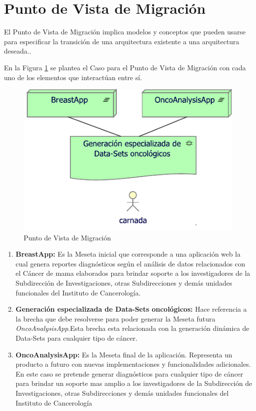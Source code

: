 \newpage
\section{Punto de Vista de Migración}
El Punto de Vista de Migración implica modelos y conceptos que pueden usarse para especificar la transición de una arquitectura existente a una arquitectura deseada.\cite{BolanosCastro2019}. 

En la Figura \ref{PvMigracion} se plantea el Caso para el Punto de Vista de Migración con cada uno de los elementos que interactúan entre sí. 

\begin{figure}[h!]
	\centering
	\includegraphics[width=0.75\linewidth]{ARQUITECTURA/imgs/CapaImplementacion/2_PvMigracion}
	\caption{Punto de Vista de Migración}
	\label{PvMigracion}
\end{figure}

\begin{enumerate}[label=\textbf{\arabic*})]
	
\item  \textbf{BreastApp:} Es la Meseta inicial que  corresponde  a una aplicación web la cual genera reportes diagnósticos según el análisis de datos relacionados con el Cáncer de mama elaborados para brindar soporte a los investigadores de la Subdirección de Investigaciones, otras Subdirecciones y demás unidades funcionales del Instituto  de Cancerología.

\item  \textbf{Generación especializada de  Data-Sets oncológicos:} Hace referencia a la brecha que debe resolverse para poder generar la Meseta futura \textit{OncoAnalysisApp}.Esta brecha esta relacionada con la generación dinámica de Data-Sets para cualquier tipo de cáncer.

\item  \textbf{OncoAnalysisApp:} Es la Meseta final de la aplicación. Representa un producto a futuro con nuevas implementaciones y funcionalidades adicionales. En este caso se pretende generar diagnósticos para cualquier tipo de cáncer para brindar un soporte mas amplio a los investigadores de la Subdirección de Investigaciones, otras Subdirecciones y demás unidades funcionales del Instituto  de Cancerología

\end{enumerate}

